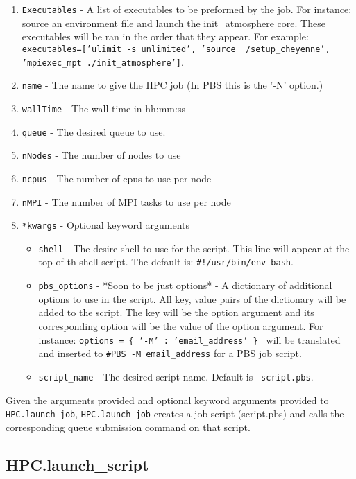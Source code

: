 \begin{enumerate}
\item {\tt Executables} - A list of executables to be preformed by the job. For
instance: source an environment file and launch the init\_atmosphere core. These
executables will be ran in the order that they appear. For example: {\tt
executables=['ulimit -s unlimited', 'source ~/setup\_cheyenne', 'mpiexec\_mpt
./init\_atmosphere']}.

\item {\tt name} - The name to give the HPC job (In PBS this is the '-N'
option.)
\item {\tt wallTime} - The wall time in hh:mm:ss
\item {\tt queue} - The desired queue to use.
\item {\tt nNodes} - The number of nodes to use
\item {\tt ncpus} - The number of cpus to use per node
\item {\tt nMPI} - The number of MPI tasks to use per node
\item {\tt**kwargs} - Optional keyword arguments
\begin{itemize} 
\item {\tt shell} - The desire shell to use for the script. This line will
appear at the top of th shell script. The default is: {\tt \#!/usr/bin/env
bash}.
\item {\tt pbs\_options} - *Soon to be just options* - A dictionary of
additional options to use in the script. All key, value pairs of the dictionary
will be added to the script. The key will be the option argument and its
corresponding option will be the value of the option argument. For instance:
{\tt options = \{ '-M' : 'email\_address' \} } will be translated and inserted
to {\tt \#PBS -M email\_address} for a PBS job script.
\item {\tt script\_name} - The desired script name. Default is {\tt
script.pbs}.
\end{itemize}
\end{enumerate}

Given the arguments provided and optional keyword arguments provided to {\tt
HPC.launch\_job}, {\tt HPC.launch\_job} creates a job script (script.pbs) and
calls the corresponding queue submission command on that script.

\subsection{HPC.launch\_script}
\label{sec:hpc_script}

